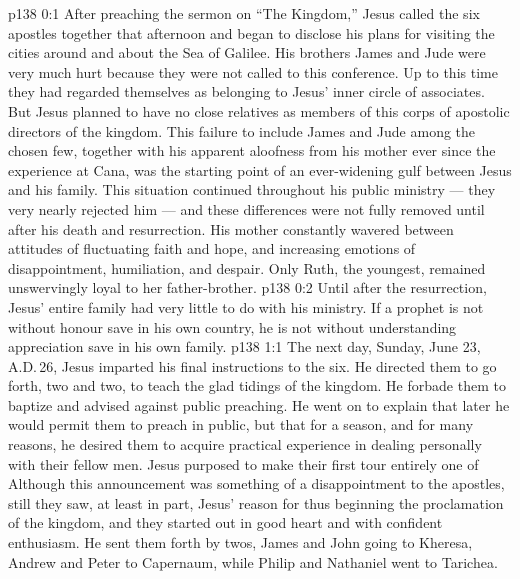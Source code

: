 \author{Midwayer Commission}
\vs p138 0:1 After preaching the sermon on “The Kingdom,” Jesus called the six apostles together that afternoon and began to disclose his plans for visiting the cities around and about the Sea of Galilee. His brothers James and Jude were very much hurt because they were not called to this conference. Up to this time they had regarded themselves as belonging to Jesus’ inner circle of associates. But Jesus planned to have no close relatives as members of this corps of apostolic directors of the kingdom. This failure to include James and Jude among the chosen few, together with his apparent aloofness from his mother ever since the experience at Cana, was the starting point of an ever\hyp{}widening gulf between Jesus and his family. This situation continued throughout his public ministry --- they very nearly rejected him --- and these differences were not fully removed until after his death and resurrection. His mother constantly wavered between attitudes of fluctuating faith and hope, and increasing emotions of disappointment, humiliation, and despair. Only Ruth, the youngest, remained unswervingly loyal to her father\hyp{}brother.
\vs p138 0:2 Until after the resurrection, Jesus’ entire family had very little to do with his ministry. If a prophet is not without honour save in his own country, he is not without understanding appreciation save in his own family.
\vs p138 1:1 The next day, Sunday, June 23, A.D.\,26, Jesus imparted his final instructions to the six. He directed them to go forth, two and two, to teach the glad tidings of the kingdom. He forbade them to baptize and advised against public preaching. He went on to explain that later he would permit them to preach in public, but that for a season, and for many reasons, he desired them to acquire practical experience in dealing personally with their fellow men. Jesus purposed to make their first tour entirely one of  Although this announcement was something of a disappointment to the apostles, still they saw, at least in part, Jesus’ reason for thus beginning the proclamation of the kingdom, and they started out in good heart and with confident enthusiasm. He sent them forth by twos, James and John going to Kheresa, Andrew and Peter to Capernaum, while Philip and Nathaniel went to Tarichea.

